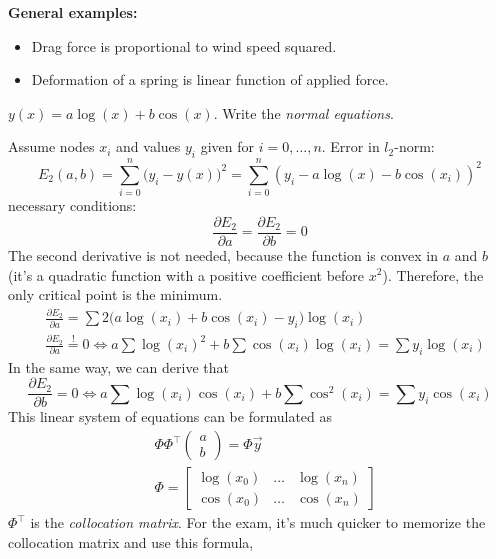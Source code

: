 \textbf{General examples:}
\begin{itemize}
    \item {
        Drag force is proportional to wind speed squared.
    }
    \item {
        Deformation of a spring is linear function of applied force.
    }
\end{itemize}

\begin{example}
    $y(x) = a \log(x) + b\cos(x)$.
    Write the \textit{normal equations}.

    Assume nodes $x_i$ and values $y_i$ given for
    $i = 0, \dots, n$. Error in $l_2$-norm:
    \[
        E_2(a, b) = \sum_{i=0}^n \bigl(y_i - y(x)\bigr)^2 = 
        \sum_{i=0}^n (y_i - a\log(x) - b\cos(x_i))^2
    \]
    necessary conditions:
    \[
        \frac{\partial E_2}{\partial a} = \frac{\partial E_2}{\partial b} = 0
    \]
    The second derivative is not needed, because the function is convex in $a$ and $b$
    (it's a quadratic function with a positive coefficient before $x^2$).
    Therefore, the only critical point is the minimum.
    \begin{align*}
        &\frac{\partial E_2}{\partial a} =
        \sum 2\bigl(a \log(x_i) + b\cos(x_i) - y_i\bigr) \log(x_i)\\
        &\frac{\partial E_2}{\partial a} \overset{!}{=} 0 \iff
        a \sum \log(x_i)^2 + b\sum \cos(x_i) \log(x_i) = 
        \sum y_i \log(x_i)
    \end{align*}
    In the same way, we can derive that
    \[
        \frac{\partial E_2}{\partial b} = 0 \iff
        a \sum \log(x_i) \cos(x_i) + b\sum \cos^2(x_i) = 
        \sum y_i \cos(x_i)
    \]
    This linear system of equations can be formulated as 
    \begin{align*}
        &\Phi \Phi^\intercal \begin{pmatrix}
            a \\ b
        \end{pmatrix} = \Phi \vec{y}
        \\&
        \Phi = \begin{bmatrix}
            \log(x_0) & \dots & \log(x_n)\\
            \cos(x_0) & \dots & \cos(x_n)
        \end{bmatrix}
    \end{align*}
    $\Phi^\intercal$ is the \textit{collocation matrix}.
    For the exam, it's much quicker
    to memorize the collocation matrix and use this formula,

\end{example}

